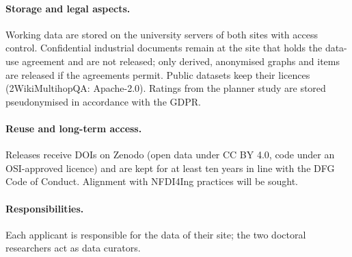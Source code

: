 \paragraph{Storage and legal aspects.} Working data are stored on the university servers of both sites with access control. Confidential industrial documents remain at the site that holds the data-use agreement and are not released; only derived, anonymised graphs and items are released if the agreements permit. Public datasets keep their licences (2WikiMultihopQA: Apache-2.0). Ratings from the planner study are stored pseudonymised in accordance with the GDPR.
\paragraph{Reuse and long-term access.} Releases receive DOIs on Zenodo (open data under CC BY 4.0, code under an OSI-approved licence) and are kept for at least ten years in line with the DFG Code of Conduct. Alignment with NFDI4Ing practices will be sought. 
\paragraph{Responsibilities.} Each applicant is responsible for the data of their site; the two doctoral researchers act as data curators.
